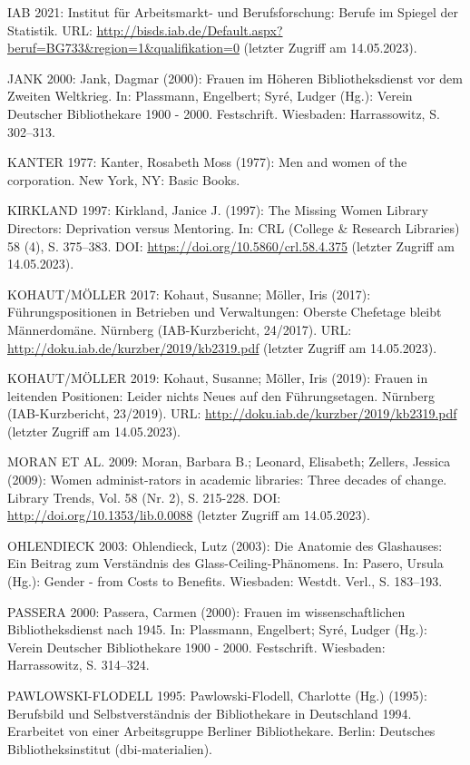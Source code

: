 \documentclass[a4paper,
fontsize=11pt,
oneside,
numbers=noperiodatend,
parskip=half-,
bibliography=totoc,
final
]{scrartcl}
\begin{document}
IAB 2021: Institut für Arbeitsmarkt- und Berufsforschung: Berufe im
Spiegel der Statistik. URL:
\url{http://bisds.iab.de/Default.aspx?beruf=BG733\&region=1\&qualifikation=0}
(letzter Zugriff am 14.05.2023).

JANK 2000: Jank, Dagmar (2000): Frauen im Höheren Bibliotheksdienst vor
dem Zweiten Weltkrieg. In: Plassmann, Engelbert; Syré, Ludger (Hg.):
Verein Deutscher Bibliothekare 1900 - 2000. Festschrift. Wiesbaden:
Harrassowitz, S. 302--313.

KANTER 1977: Kanter, Rosabeth Moss (1977): Men and women of the
corporation. New York, NY: Basic Books.

KIRKLAND 1997: Kirkland, Janice J. (1997): The Missing Women Library
Directors: Deprivation versus Mentoring. In: CRL (College \& Research
Libraries) 58 (4), S. 375--383. DOI:
\url{https://doi.org/10.5860/crl.58.4.375} (letzter Zugriff am
14.05.2023).

KOHAUT/MÖLLER 2017: Kohaut, Susanne; Möller, Iris (2017):
Führungspositionen in Betrieben und Verwaltungen: Oberste Chefetage
bleibt Männerdomäne. Nürnberg (IAB-Kurzbericht, 24/2017). URL:
\url{http://doku.iab.de/kurzber/2019/kb2319.pdf} (letzter Zugriff am
14.05.2023).

KOHAUT/MÖLLER 2019: Kohaut, Susanne; Möller, Iris (2019): Frauen in
leitenden Positionen: Leider nichts Neues auf den Führungsetagen.
Nürnberg (IAB-Kurzbericht, 23/2019). URL:
\url{http://doku.iab.de/kurzber/2019/kb2319.pdf} (letzter Zugriff am
14.05.2023).

MORAN ET AL. 2009: Moran, Barbara B.; Leonard, Elisabeth; Zellers,
Jessica (2009): Women administ-rators in academic libraries: Three
decades of change. Library Trends, Vol. 58 (Nr. 2), S. 215-228. DOI:
\url{http://doi.org/10.1353/lib.0.0088} (letzter Zugriff am 14.05.2023).

OHLENDIECK 2003: Ohlendieck, Lutz (2003): Die Anatomie des Glashauses:
Ein Beitrag zum Verständnis des Glass-Ceiling-Phänomens. In: Pasero,
Ursula (Hg.): Gender - from Costs to Benefits. Wiesbaden: Westdt. Verl.,
S. 183--193.

PASSERA 2000: Passera, Carmen (2000): Frauen im wissenschaftlichen
Bibliotheksdienst nach 1945. In: Plassmann, Engelbert; Syré, Ludger
(Hg.): Verein Deutscher Bibliothekare 1900 - 2000. Festschrift.
Wiesbaden: Harrassowitz, S. 314--324.

PAWLOWSKI-FLODELL 1995: Pawlowski-Flodell, Charlotte (Hg.) (1995):
Berufsbild und Selbstverständnis der Bibliothekare in Deutschland 1994.
Erarbeitet von einer Arbeitsgruppe Berliner Bibliothekare. Berlin:
Deutsches Bibliotheksinstitut (dbi-materialien).
\end{document}
